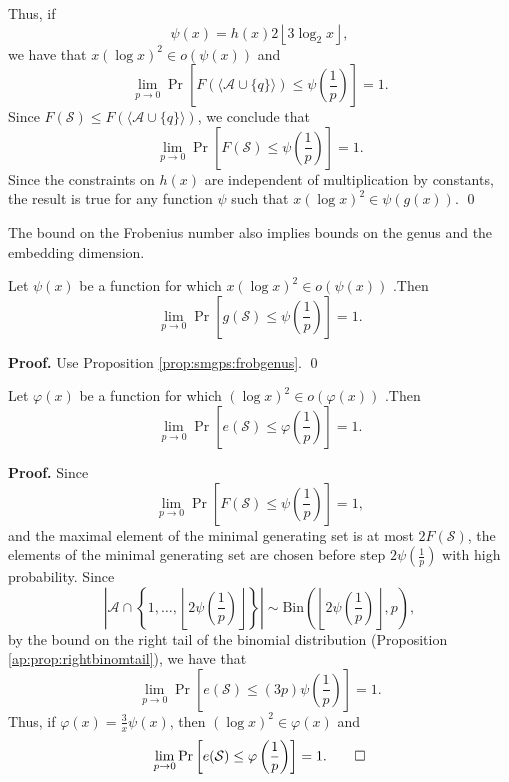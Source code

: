 Thus, if
\[\psi(x) = h\left(x\right)2\left\lfloor 3\log_2 x\right\rfloor,\]
we have that $x(\log x)^2 \in o(\psi(x))$ and
\[\lim_{p \to  0} \Pr\left[F(\langle\mathcal{A}\cup \{q\}\rangle) \leq \psi\left(\frac{1}{p}\right)\right] = 1.\]
Since $F(\mathcal{S}) \leq F(\langle \mathcal{A}\cup\{q\}\rangle)$, we conclude that
\[\lim_{p \to 0}\Pr\left[F(\mathcal{S}) \leq \psi\left(\frac{1}{p}\right)\right] = 1.\]
Since the constraints on $h(x)$ are independent of multiplication by constants, the result is true for any function $\psi$ such that $x(\log x)^2 \in \psi(g(x))$. \qed \par
The bound on the Frobenius number also implies bounds on the genus and the embedding dimension.
\begin{corollary}
    Let $\psi(x)$ be a function for which $x(\log x)^2 \in o(\psi(x))$ .Then
    \[\lim_{p \to 0}\Pr\left[g(\mathcal{S}) \leq \psi\left(\frac{1}{p}\right)\right] = 1.\]
\end{corollary}
\textbf{Proof. } Use Proposition \ref{prop:smgps:frobgenus}. \qed
\begin{corollary}
    Let $\varphi(x)$ be a function for which $(\log x)^2 \in o(\varphi(x))$ .Then
    \[\lim_{p \to 0}\Pr\left[e(\mathcal{S}) \leq \varphi\left(\frac{1}{p}\right)\right] = 1.\]
\end{corollary}
\textbf{Proof. } Since
\[\lim_{p \to 0}\Pr\left[F(\mathcal{S}) \leq \psi\left(\frac{1}{p}\right)\right] = 1,\]
and the maximal element of the minimal generating set is at most $2F(\mathcal{S})$, the elements of the minimal generating set are chosen before step $2\psi\left(\frac{1}{p}\right)$ with high probability. Since \[\left|\mathcal{A}\cap\left\{1, \ldots, \left\lfloor2\psi\left(\frac{1}{p}\right)\right \rfloor\right\}\right| \sim \mathrm{Bin}\left(\left\lfloor2\psi\left(\frac{1}{p}\right)\right \rfloor, p\right),\] by the bound on the right tail of the binomial distribution (Proposition \ref{ap:prop:rightbinomtail}), we have that
\[\lim_{p \to 0}\Pr\left[e(\mathcal{S}) \leq (3p)\psi\left(\frac{1}{p}\right)\right] = 1.\]
Thus, if $\varphi(x) = \frac{3}{x} \psi\left(x\right)$, then $(\log x)^2 \in \varphi(x)$ and 
\[\lim_{p \to 0}\Pr\left[e(\mathcal{S}) \leq \varphi\left(\frac{1}{p}\right)\right] = 1.\qed \]

